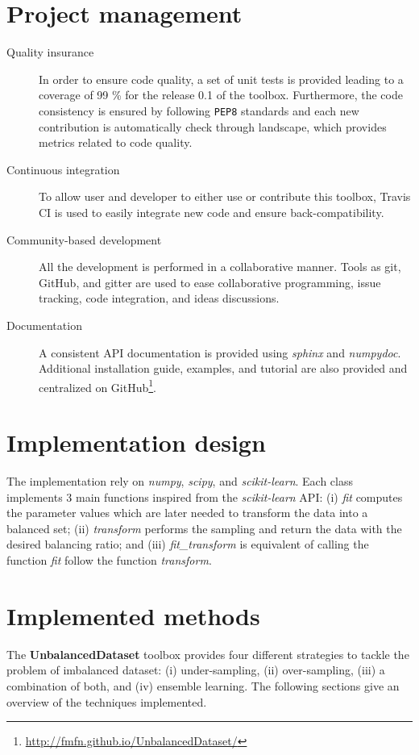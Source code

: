 \documentclass[twoside,11pt]{article}
\begin{document}
\section{Project management}

\begin{description}
  \item[Quality insurance] In order to ensure code quality, a set of unit tests is provided leading to a coverage of 99 \% for the release 0.1 of the toolbox.
Furthermore, the code consistency is ensured by following \texttt{PEP8} standards and each new contribution is automatically check through landscape, which provides metrics related to code quality.
  \item[Continuous integration] To allow user and developer to either use or contribute this toolbox, Travis CI is used to easily integrate new code and ensure back-compatibility.
  \item[Community-based development] All the development is performed in a collaborative manner.
Tools as git, GitHub, and gitter are used to ease collaborative programming, issue tracking, code integration, and ideas discussions.
  \item[Documentation] A consistent API documentation is provided using \emph{sphinx} and \emph{numpydoc}.
Additional installation guide, examples, and tutorial are also provided and centralized on GitHub\footnote{\url{http://fmfn.github.io/UnbalancedDataset/}}.
\end{description}


\section{Implementation design}

The implementation rely on \emph{numpy}, \emph{scipy}, and \emph{scikit-learn}.
Each class implements 3 main functions inspired from the \emph{scikit-learn} API:
(i) \emph{fit} computes the parameter values which are later needed to transform the data into a balanced set;
(ii) \emph{transform} performs the sampling and return the data with the desired balancing ratio;
and (iii) \emph{fit\_transform} is equivalent of calling the function \emph{fit} follow the function \emph{transform}.

\section{Implemented methods}

The \textbf{UnbalancedDataset} toolbox provides four different strategies to tackle the problem of imbalanced dataset:
(i) under-sampling, (ii) over-sampling, (iii) a combination of both, and (iv) ensemble learning.
The following sections give an overview of the techniques implemented.
\end{document}
